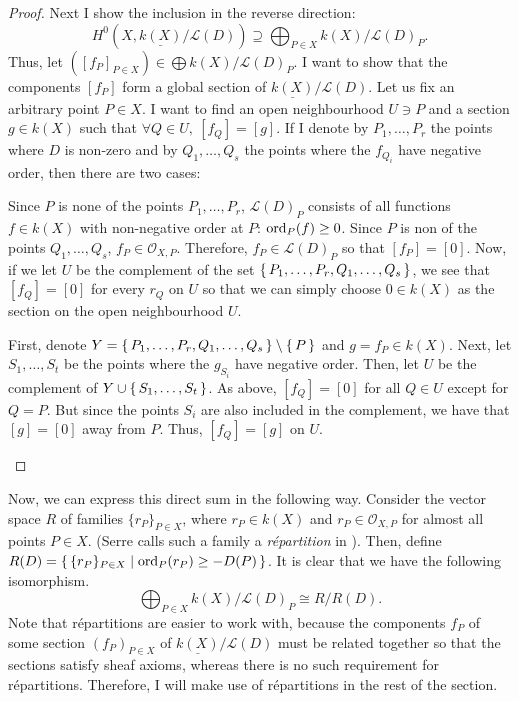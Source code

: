 \begin{proof}
  Next I show the inclusion in the reverse direction:
  \[
    H^{0}(X,\underline{k(X)}/\mathcal{L}(D))\supseteq\bigoplus_{P\in X}
    k(X)/\mathcal{L}(D)_{P}.
  \]
  Thus, let $([f_{P}]_{P\in X})\in\displaystyle\bigoplus
  k(X)/\mathcal{L}(D)_{P}$. I want to show that the components $[f_{P}]$
  form a global section of $\underline{k(X)}/\mathcal{L}(D)$. Let us
  fix an arbitrary point $P\in X$. I want to find an open neighbourhood
  $U\ni P$ and a section $g\in k(X)$ such that $\forall Q\in U,\ [f_{Q}]=[g]$.
  If I denote by $P_{1},\ldots,P_{r}$ the points where $D$ is non-zero
  and by $Q_{1},\ldots,Q_{s}$ the points where the $f_{Q_{i}}$ have negative
  order, then there are two cases:
  \begin{description}[style=nextline]
    \item[$P\not\in\set{P_{1},\ldots,P_{r},Q_{1},\ldots,Q_{s}}\big)$]
          Since $P$ is none of the points $P_{1},\ldots,P_{r}$,
          $\mathcal{L}(D)_{P}$ consists of all functions $f\in k(X)$
          with non-negative order at $P$: $\operatorname{ord}_{P}(f)\geq 0$.
          Since $P$ is non of the points $Q_{1},\ldots,Q_{s}$,
          $f_{P}\in\mathscr{O}_{X,P}$. Therefore, $f_{P}\in\mathcal{L}(D)_{P}$
          so that $[f_{P}]=[0]$. Now, if we let $U$ be the complement of
          the set $\set{P_{1},\ldots,P_{r},Q_{1},\ldots,Q_{s}}$, we see
          that $[f_{Q}]=[0]$ for every $r_{Q}$ on $U$ so that we can simply
          choose $0\in k(X)$ as the section on the open neighbourhood $U$.
    \item[$P\in\set{P_{1},\ldots,P_{r},Q_{1},\ldots,Q_{s}}\big)$]
          First, denote $Y=\set{P_{1},\ldots,P_{r},Q_{1},\ldots,Q_{s}}
          \setminus \set{P}$ and $g=f_{P}\in k(X)$. Next, let
          $S_{1},\ldots,S_{t}$ be the points where the $g_{S_{i}}$ have
          negative order. Then, let $U$ be the complement of
          $Y\cup \set{S_{1},\ldots,S_{t}}$. As above, $[f_{Q}]=[0]$ for all
          $Q\in U$ except for $Q=P$. But since the points $S_{i}$ are also
          included in the complement, we have that $[g]=[0]$ away from $P$.
          Thus, $[f_{Q}]=[g]$ on $U$.
  \end{description}
\end{proof}
Now, we can express this direct sum in the following way. Consider the
vector space $R$ of families $\{r_{P}\}_{P\in X}$, where $r_{P}\in k(X)$ and
$r_{P}\in\mathscr{O}_{X,P}$ for almost all points $P\in X$.
(Serre calls such a family a \emph{r\'epartition} in \cite{serre}).
Then, define $R(D)=\set{\{r_{P}\}_{P\in X}\mid \operatorname{ord}_{P}(r_{P})\geq -D(P)}$.
It is clear that we have the following isomorphism.
\[
  \bigoplus_{P\in X}k(X)/\mathcal{L}(D)_{P}\cong R/R(D).
\]
Note that r\'epartitions are easier to work with, because the components
$f_{P}$ of some section $(f_{P})_{P\in X}$ of
$\underline{k(X)}/\mathcal{L}(D)$ must be related together so that the
sections satisfy sheaf axioms, whereas there is no such requirement for
r\'epartitions. Therefore, I will make use of r\'epartitions in the rest
of the section.

